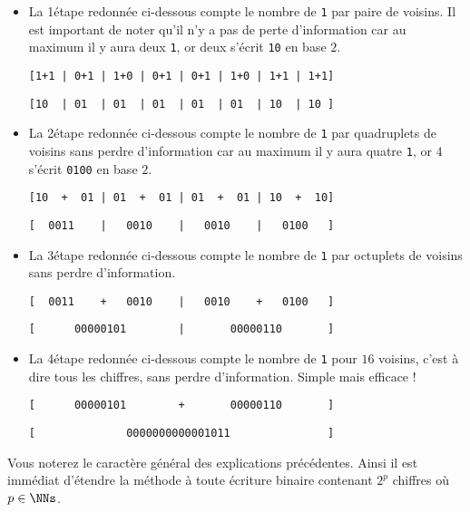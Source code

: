 \documentclass[12pt]{amsart}
\begin{document}
\begin{itemize}[label=\small\textbullet]
	\item La 1\iere étape redonnée ci-dessous compte le nombre de \verb+1+ par paire de voisins. 
	Il est important de noter qu'il n'y a pas de perte d'information car au maximum il y aura deux \verb+1+, or deux s'écrit \verb+10+ en base $2$. 

	\begin{center}
	\verb-[1+1 | 0+1 | 1+0 | 0+1 | 0+1 | 1+0 | 1+1 | 1+1]-

	\verb-[10  | 01  | 01  | 01  | 01  | 01  | 10  | 10 ]-
	\end{center}


	\item La 2\ieme étape redonnée ci-dessous compte le nombre de \verb+1+ par quadruplets de voisins sans perdre d'information car au maximum il y aura quatre \verb+1+, or $4$ s'écrit \verb+0100+ en base $2$. 

	\begin{center}
	\verb-[10  +  01 | 01  +  01 | 01  +  01 | 10  +  10]-

	\verb-[  0011    |   0010    |   0010    |   0100   ]-
	\end{center}


	\item La 3\ieme étape redonnée ci-dessous compte le nombre de \verb+1+ par octuplets de voisins sans perdre d'information. 

	\begin{center}
	\verb-[  0011    +   0010    |   0010    +   0100   ]-

	\verb-[      00000101        |       00000110       ]-
	\end{center}


	\item La 4\ieme étape redonnée ci-dessous compte le nombre de \verb+1+ pour $16$ voisins, c'est à dire tous les chiffres, sans perdre d'information. Simple mais efficace !

	\begin{center}
	\verb-[      00000101        +       00000110       ]-

	\verb-[              0000000000001011               ]-
	\end{center}
\end{itemize}

Vous noterez le caractère général des explications précédentes.
Ainsi il est immédiat d'étendre la méthode à toute écriture binaire contenant $2^p$ chiffres où $p\in\NNs$.
\end{document}

